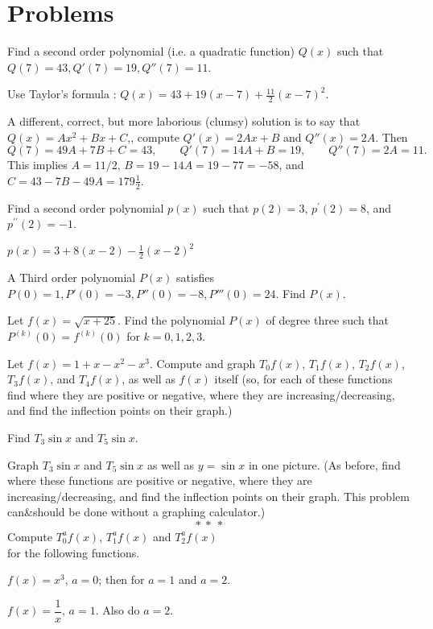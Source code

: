 \section{Problems} %
\problemfont %
\begin{multicols}{2}
\problem Find a second order polynomial (i.e. a quadratic function) %
$Q(x)$ such that $Q(7)=43, Q'(7)=19, Q''(7)=11$.


\answer %
Use Taylor's formula : \( Q(x)= 43+19(x-7)+\frac{11}{2}(x-7)^2 \).

A different, correct, but more laborious (clumsy) solution is to say
that $Q(x)=Ax^2+Bx+C$,, compute $Q'(x)=2Ax+B$ and $Q''(x)=2A$.  Then
\[
Q(7) = 49A + 7B + C = 43,\qquad Q'(7) = 14 A + B = 19,\qquad Q''(7) =
2A = 11.
\]
This implies $A=11/2$, $B=19-14A = 19 - 77 = -58$, and $C= 43 - 7B -
49A = 179\tfrac12$.
\endanswer

\problem %
Find a second order polynomial
$p(x)$ such that
$p(2)=3$, $p^\prime(2)=8$, and $p^{\prime\prime}(2)=-1$.

\answer $p(x)=3+8(x-2)-\frac12 (x-2)^2$ %
\endanswer

\problem A Third order polynomial $P(x)$ satisfies $ P(0)=1, P'(0) = %
-3, P'' (0)=-8, P'''(0)=24$.  Find $P(x)$.

\problem Let $f(x)=\sqrt{x+25}$.  Find the polynomial $P(x)$ of degree %
three such that $P^{(k)}(0)=f^{(k)}(0)$ for $k=0,1,2,3$.

\problem Let $f(x) = 1+x-x^2-x^3$. Compute and graph $T_0f(x)$, %
$T_1f(x)$, $T_2f(x)$, $T_3f(x)$, and $T_4f(x)$, as well as $f(x)$
itself (so, for each of these functions find where they are positive or
negative, where they are increasing/decreasing, and find the inflection
points on their graph.)


\problem \subprob Find $T_3\sin x$ and $T_5\sin x$. %

\subprob Graph $T_3\sin x$ and $T_5\sin x$ as well as $y=\sin x$ in one picture.
(As before, find where these functions are positive or negative, where they are
increasing/decreasing, and find the inflection points on their graph. This
problem can\&should be done without a graphing calculator.)
\[
  *~*~*
\]
\begingroup
\noindent\color{darkbluegreen}%
Compute $T^a_0f(x)$, $T^a_1f(x)$ and $T^a_2f(x)$\\ for the following functions.
\endgroup

\problem $f(x) = x^3$, $a=0$; then for $a=1$ and $a=2$. %

\problem $f(x) = \dfrac1x$, $a=1$.  Also do $a=2$. %


\end{multicols}

